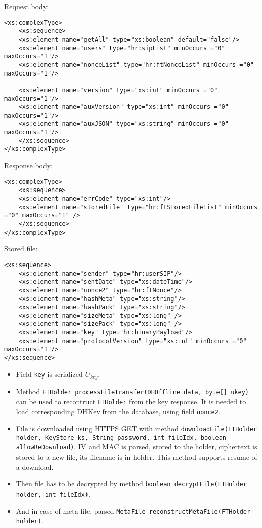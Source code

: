 \documentclass[a4paper,10pt]{article}
\begin{document}
Request body:
\begin{Verbatim}[frame=single]
<xs:complexType>
    <xs:sequence>
	<xs:element name="getAll" type="xs:boolean" default="false"/>
	<xs:element name="users" type="hr:sipList" minOccurs ="0" maxOccurs="1"/>
	<xs:element name="nonceList" type="hr:ftNonceList" minOccurs ="0" maxOccurs="1"/>
	
	<xs:element name="version" type="xs:int" minOccurs ="0" maxOccurs="1"/>
	<xs:element name="auxVersion" type="xs:int" minOccurs ="0" maxOccurs="1"/>
	<xs:element name="auxJSON" type="xs:string" minOccurs ="0" maxOccurs="1"/>
    </xs:sequence>
</xs:complexType>
\end{Verbatim}

Response body:
\begin{Verbatim}[frame=single]
<xs:complexType>
    <xs:sequence>
	<xs:element name="errCode" type="xs:int"/>
	<xs:element name="storedFile" type="hr:ftStoredFileList" minOccurs ="0" maxOccurs="1" />
    </xs:sequence>
</xs:complexType>
\end{Verbatim}

\newpage
Stored file:
\begin{Verbatim}[frame=single]
<xs:sequence>
    <xs:element name="sender" type="hr:userSIP"/>
    <xs:element name="sentDate" type="xs:dateTime"/>
    <xs:element name="nonce2" type="hr:ftNonce"/>
    <xs:element name="hashMeta" type="xs:string"/>
    <xs:element name="hashPack" type="xs:string"/>
    <xs:element name="sizeMeta" type="xs:long" />
    <xs:element name="sizePack" type="xs:long" />
    <xs:element name="key" type="hr:binaryPayload"/>
    <xs:element name="protocolVersion" type="xs:int" minOccurs ="0" maxOccurs="1"/>
</xs:sequence>
\end{Verbatim}

\begin{itemize}
 \item Field \texttt{key} is serialized $U_{key}$.
 \item Method \texttt{FTHolder processFileTransfer(DHOffline data, byte[] ukey)} can be used to recontruct \texttt{FTHolder} from the key response.
    It is needed to load corresponding DHKey from the database, using field \texttt{nonce2}.
 \item File is downloaded using HTTPS GET with method \texttt{downloadFile(FTHolder holder, KeyStore ks, String password, int fileIdx, boolean allowReDownload)}.
	IV and MAC is parsed, stored to the holder, ciphertext is stored to a new file, its filename is in holder. This method supports resume of a download.
 \item Then file has to be decrypted by method \texttt{boolean decryptFile(FTHolder holder, int fileIdx)}.
 \item And in case of meta file, parsed \texttt{MetaFile reconstructMetaFile(FTHolder holder)}.
\end{itemize}
\end{document}
